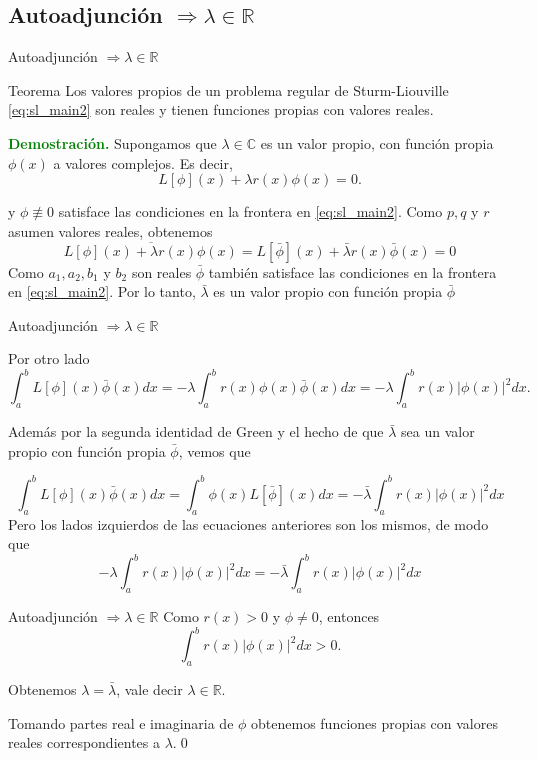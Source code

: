 \documentclass[xcolor=dvipsnames,a4paper,10pt,handout]{beamer}
\newcommand{\rr}{\mathbb{R}}
\renewcommand{\textbf}[1]{\textcolor{green}{\bfseries #1}}
\begin{document}
\subsection{Autoadjunción $\Rightarrow \lambda\in\rr$}  
\begin{frame}{Autoadjunción $\Rightarrow \lambda\in\rr$}
\onslide<+->
\begin{block}{Teorema} Los valores propios de un problema regular de Sturm-Liouville \eqref{eq:sl_main2}  son reales y tienen funciones propias con valores reales.
 
\end{block}

\onslide<+->
\textbf{Demostración.} Supongamos que $\lambda\in \mathbb{C}$ es un valor propio, con función propia $\phi(x)$ a valores complejos. Es decir,
$$L[\phi](x)+\lambda r(x) \phi(x)=0.$$

y $\phi\not\equiv 0$ satisface las condiciones en la frontera en  \eqref{eq:sl_main2}. Como $p, q$ y $r$ asumen valores reales, obtenemos
$$\overline{L[\phi](x)+\lambda r(x) \phi(x)}=L[\bar{\phi}](x)+\bar{\lambda} r(x) \bar{\phi}(x)=0$$
Como $a_{1}, a_{2}, b_{1}$ y $b_{2}$ son reales $\bar{\phi}$ también satisface las condiciones en la frontera en \eqref{eq:sl_main2}. Por lo tanto, $\bar{\lambda}$ es un valor propio con función propia $\bar{\phi}$

\end{frame}


\begin{frame}{Autoadjunción $\Rightarrow \lambda\in\rr$}

Por otro lado
$$\int_{a}^{b} L[\phi](x) \bar{\phi}(x) d x=-\lambda \int_{a}^{b} r(x) \phi(x) \bar{\phi}(x) d x=-\lambda \int_{a}^{b} r(x)|\phi(x)|^{2} d x.$$


Además por la segunda identidad de Green y el hecho de que $\bar{\lambda}$ sea un valor propio con función propia $\bar{\phi}$, vemos que


$$
\int_{a}^{b} L[\phi](x) \bar{\phi}(x) d x=\int_{a}^{b} \phi(x) L[\bar{\phi}](x) d x=-\bar{\lambda} \int_{a}^{b} r(x)|\phi(x)|^{2} d x
$$
Pero los lados izquierdos de las ecuaciones anteriores son los mismos, de modo que 
$$
-\lambda \int_{a}^{b} r(x)|\phi(x)|^{2} d x=-\bar{\lambda} \int_{a}^{b} r(x)|\phi(x)|^{2} d x
$$

\end{frame}


\begin{frame}{Autoadjunción $\Rightarrow \lambda\in\rr$}
Como $r(x)>0$ y $\phi\neq 0$, entonces 
$$\int_{a}^{b} r(x)|\phi(x)|^{2} d x>0.$$ 

Obtenemos $\lambda=\bar{\lambda}$, vale decir $\lambda\in\rr$. 

Tomando partes real e imaginaria de  $\phi$ obtenemos  funciones propias con valores reales correspondientes a $\lambda$.\qed 
\end{frame}
\end{document}
